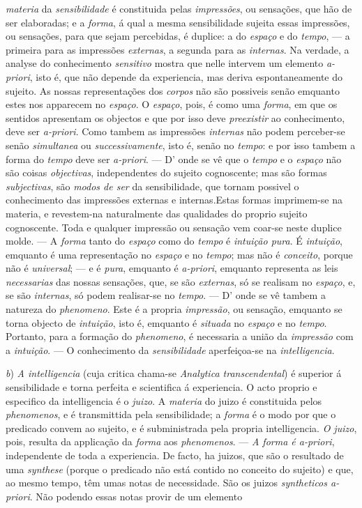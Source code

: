 \emph{materia} da \emph{sensibilidade} é constituida pelas \emph{impressões}, ou sensações, que hão de ser elaboradas; e a \emph{forma}, á qual a mesma sensibilidade sujeita essas impressões, ou sensações, para que sejam percebidas, é duplice: a do \emph{espaço} e do \emph{tempo}, --- a primeira para as impressões \emph{externas}, a segunda para as \emph{internas}. Na verdade, a analyse do conhecimento \emph{sensitivo} mostra que nelle intervem um elemento \emph{a-priori}, isto é, que não depende da experiencia, mas deriva espontaneamente do sujeito. As nossas representações dos \emph{corpos} não são possiveis senão emquanto estes nos apparecem no \emph{espaço}. O \emph{espaço}, pois, é como uma \emph{forma}, em que os sentidos apresentam os objectos e que por isso deve \emph{preexistir} ao conhecimento, deve ser \emph{a-priori}. Como tambem as impressões \emph{internas} não podem perceber-se senão \emph{simultanea} ou \emph{successivamente}, isto é, senão no \emph{tempo}: e por isso tambem a forma do \emph{tempo} deve ser \emph{a-priori}. --- D' onde se vê que o \emph{tempo} e o \emph{espaço} não são coisas \emph{objectivas}, independentes do sujeito cognoscente; mas são formas \emph{subjectivas}, são \emph{modos de ser} da sensibilidade, que tornam possivel o conhecimento das impressões externas e internas.Estas formas imprimem-se na materia, e revestem-na naturalmente das qualidades do proprio sujeito cognoscente. Toda e qualquer impressão ou sensação vem coar-se neste duplice molde. --- A \emph{forma} tanto do \emph{espaço} como do \emph{tempo} é \emph{intuição pura}. É \emph{intuição}, emquanto é uma representação no \emph{espaço} e no \emph{tempo}; mas não é \emph{conceito}, porque não é \emph{universal}; --- e é \emph{pura}, emquanto é \emph{a-priori}, emquanto representa as leis \emph{necessarias} das nossas sensações, que, se são \emph{externas}, só se realisam no \emph{espaço}, e, se são \emph{internas}, só podem realisar-se no \emph{tempo}. --- D' onde se vê tambem a natureza do \emph{phenomeno}. Este é a propria \emph{impressão}, ou sensação, emquanto se torna objecto de \emph{intuição}, isto é, emquanto é \emph{situada} no \emph{espaço} e no \emph{tempo}. Portanto, para a formação do \emph{phenomeno}, é necessaria a união da \emph{impressão} com a \emph{intuição}. --- O conhecimento da \emph{sensibilidade} aperfeiçoa-se na \emph{intelligencia}.\par \emph{b}) \emph{A intelligencia} (cuja critica chama-se \emph{Analytica transcendental}) é superior á sensibilidade e torna perfeita e scientifica á experiencia. O acto proprio e especifico da intelligencia é o \emph{juizo}. A \emph{materia} do juizo é constituida pelos \emph{phenomenos}, e é transmittida pela sensibilidade; a \emph{forma} é o modo por que o predicado convem ao sujeito, e é subministrada pela propria intelligencia. \emph{O juizo}, pois, resulta da applicação da \emph{forma} aos \emph{phenomenos}. --- \emph{A forma é a-priori}, independente de toda a experiencia. De facto, ha juizos, que são o resultado de uma \emph{synthese} (porque o predicado não está contido no conceito do sujeito) e que, ao mesmo tempo, têm umas notas de necessidade. São os juizos \emph{syntheticos a-priori}. Não podendo essas notas provir de um elemento 